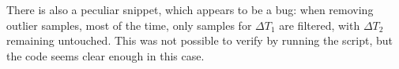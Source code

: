 \documentclass[../main.tex]{subfiles}
\begin{document}
There is also a peculiar snippet, which appears to be a bug: when removing outlier samples, most of the time, only samples for $\Delta T_1$ are filtered, with $\Delta T_2$ remaining untouched. This was not possible to verify by running the script, but the code seems clear enough in this case.


\end{document}
